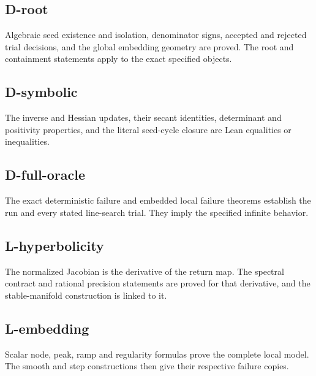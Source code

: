 

\subsection{D-root}\label{d-root}

Algebraic seed existence and isolation, denominator signs, accepted and rejected trial decisions, and the global embedding geometry are proved. The root and containment statements apply to the exact specified objects.



\subsection{D-symbolic}\label{d-symbolic}

The inverse and Hessian updates, their secant identities, determinant and positivity properties, and the literal seed-cycle closure are Lean equalities or inequalities.



\subsection{D-full-oracle}\label{d-full-oracle}

The exact deterministic failure and embedded local failure theorems establish the run and every stated line-search trial. They imply the specified infinite behavior.



\subsection{L-hyperbolicity}\label{l-hyperbolicity}

The normalized Jacobian is the derivative of the return map. The spectral contract and rational precision statements are proved for that derivative, and the stable-manifold construction is linked to it.



\subsection{L-embedding}\label{l-embedding}

Scalar node, peak, ramp and regularity formulas prove the complete local model. The smooth and step constructions then give their respective failure copies.

